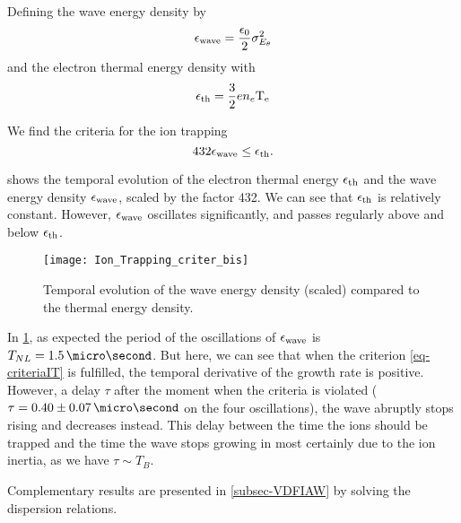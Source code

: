     Defining the wave energy  density by
    \begin{equation} \label{eq-waveE}
      \epsilon_{\rm wave} = \frac{\epsilon_0}{2} \sigma_{E_{\theta}}^2
    \end{equation}
    and the electron thermal energy density with
    \begin{equation} \label{eq-thE}
      \epsilon_{\rm th} = \frac{3}{2} e n_e \mathrm{T_e}
    \end{equation}
    
    We find the criteria for the ion trapping
    \begin{equation} \label{eq-criteriaIT}
      432 \epsilon_{\rm wave} \leq \epsilon_{\rm th}.
    \end{equation}
    
     shows the temporal evolution of the electron thermal energy $\epsilon_{\rm th}$ and the wave energy density $\epsilon_{\rm wave}$, scaled by the factor 432.
    We can see that $\epsilon_{\rm th}$ is relatively constant.
    However, $\epsilon_{\rm wave}$  oscillates significantly, and passes regularly above and below $\epsilon_{\rm th}$.
    
    \begin{figure}[hbtp]
      \centering
      \texttt{[image: Ion\_Trapping\_criter\_bis]}
      \caption{Temporal evolution of the wave energy density (scaled) compared to the thermal energy density.}
      \label{fig-tempITcrit}
    \end{figure}
    
    In \cref{fig-tempITcrit}, as expected the period of the oscillations of $\epsilon_{\rm wave}$ is $T_{NL} = 1.5\,\micro\second$.
    But here, we can see that when the criterion \cref{eq-criteriaIT} is fulfilled, the temporal derivative of the growth rate is positive.
    However, a delay $\tau$ after the moment when the criteria is violated ($\tau = 0.40 \pm 0.07 \,\micro\second$ on the four oscillations), the wave abruptly stops rising and decreases instead.
    This delay between the time the ions should be trapped and the time the wave stops growing in most certainly due to the ion inertia, as we have $\tau \sim T_B$.
    
    Complementary results are presented in \cref{subsec-VDFIAW} by solving the dispersion relations.
    

